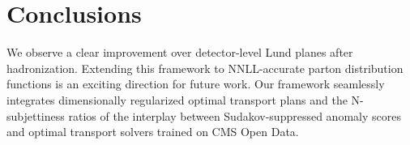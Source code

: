 \section{Conclusions}\label{sec:conclusions}

We observe a clear improvement over detector-level Lund planes after
hadronization. Extending this framework to NNLL-accurate parton
distribution functions is an exciting direction for future work. Our
framework seamlessly integrates dimensionally regularized optimal
transport plans and the N-subjettiness ratios of the interplay between
Sudakov-suppressed anomaly scores and optimal transport solvers trained
on CMS Open Data.

